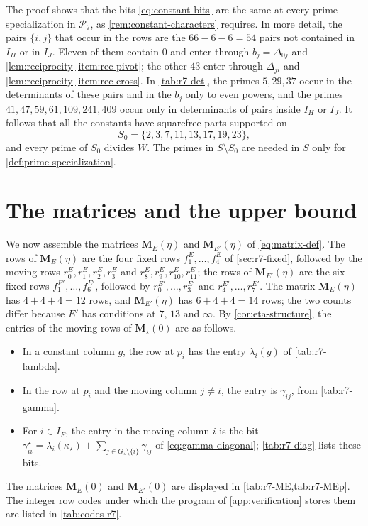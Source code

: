 \documentclass[12pt,oneside,openany]{book}
\theoremstyle{definition}
\theoremstyle{plain}
\numberwithin{equation}{chapter}
\theoremstyle{plain}
\theoremstyle{definition}
\theoremstyle{remark}
\newcommand{\cP}{\mathcal P}
\begin{document}
The proof shows that the bits \eqref{eq:constant-bits} are the same at every
prime specialization in $\cP_7$, as \cref{rem:constant-characters}
requires. In more detail, the pairs $\{i,j\}$ that occur in the rows are the
$66-6-6=54$ pairs not contained in $I_H$ or in $I_J$. Eleven of them contain
$0$ and enter through $b_j=\Delta_{0j}$ and
\cref{lem:reciprocity}\ref{item:rec-pivot}; the other $43$ enter through
$\Delta_{ji}$ and \cref{lem:reciprocity}\ref{item:rec-cross}.
In \cref{tab:r7-det}, the primes $5,29,37$ occur in the determinants of
these pairs and in the $b_j$ only to even powers, and the primes
$41,47,59,61,109,241,409$ occur only in determinants of pairs inside $I_H$
or $I_J$. It follows that all the constants have squarefree parts
supported on
\[
 S_0=\{2,3,7,11,13,17,19,23\},
\]
and every prime of $S_0$ divides $W$. The primes in $S\setminus S_0$ are
needed in $S$ only for \cref{def:prime-specialization}.

\section{The matrices and the upper bound}\label{sec:r7-matrices}

We now assemble the matrices $\mathbf M_E(\eta)$ and $\mathbf M_{E'}(\eta)$
of \eqref{eq:matrix-def}. The rows of $\mathbf M_E(\eta)$ are the four fixed
rows $f^E_1,\dots,f^E_4$ of \cref{sec:r7-fixed}, followed by the moving rows
$r^E_0,r^E_1,r^E_2,r^E_3$ and $r^E_8,r^E_9,r^E_{10},r^E_{11}$; the rows of
$\mathbf M_{E'}(\eta)$ are the six fixed rows $f^{E'}_1,\dots,f^{E'}_6$,
followed by $r^{E'}_0,\dots,r^{E'}_3$ and $r^{E'}_4,\dots,r^{E'}_7$. The matrix $\mathbf M_E(\eta)$ has $4+4+4=12$ rows, and $\mathbf M_{E'}(\eta)$ has
$6+4+4=14$ rows; the two counts differ because $E'$ has conditions at $7$,
$13$ and $\infty$. By \cref{cor:eta-structure}, the entries of the moving
rows of $\mathbf M_\star(0)$ are as follows.
\begin{itemize}
\item In a constant column $g$, the row at $p_i$ has the entry
$\lambda_i(g)$ of \cref{tab:r7-lambda}.
\item In the row at $p_i$ and the moving column $j\ne i$, the entry is
$\gamma_{ij}$, from \cref{tab:r7-gamma}.
\item For $i\in I_F$, the entry in the moving column $i$ is the bit
$\gamma^\star_{ii}=\lambda_i(\kappa_\star)+\sum_{j\in G_\star\setminus\{i\}}\gamma_{ij}$
of \eqref{eq:gamma-diagonal}; \cref{tab:r7-diag} lists these bits.
\end{itemize}
The matrices $\mathbf M_E(0)$ and $\mathbf M_{E'}(0)$ are displayed in
\cref{tab:r7-ME,tab:r7-MEp}. The integer row codes under which the program
of \cref{app:verification} stores them are listed in
\cref{tab:codes-r7}.
\end{document}
